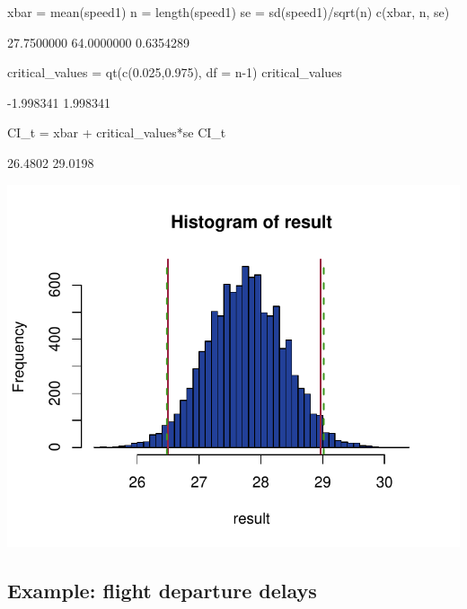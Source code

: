 \documentclass[a4paper]{article}\usepackage[]{graphicx}\usepackage[]{xcolor}
\makeatletter
\def\maxwidth{ %
  \ifdim\Gin@nat@width>\linewidth
    \linewidth
  \else
    \Gin@nat@width
  \fi
}
\makeatother
\begin{document}
\begin{Schunk}
\begin{Sinput}
xbar = mean(speed1)
n = length(speed1)
se = sd(speed1)/sqrt(n)
c(xbar, n, se)
\end{Sinput}
\begin{Soutput}
[1] 27.7500000 64.0000000  0.6354289
\end{Soutput}
\begin{Sinput}
critical_values = qt(c(0.025,0.975), df = n-1)
critical_values
\end{Sinput}
\begin{Soutput}
[1] -1.998341  1.998341
\end{Soutput}
\begin{Sinput}
CI_t = xbar + critical_values*se
CI_t
\end{Sinput}
\begin{Soutput}
[1] 26.4802 29.0198
\end{Soutput}


{\centering \includegraphics[width=\maxwidth]{figure/listings-unnamed-chunk-173-1} 

}

\end{Schunk}
\subsection{Example: flight departure delays}
\end{document}
